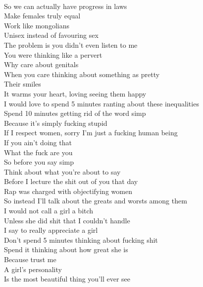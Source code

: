 \documentclass[12pt, b5paper, oneside]{book}
\begin{document}
\\So we can actually have progress in laws
\\Make females truly equal
\\Work like mongolians 
\\Unisex instead of favouring sex
\\The problem is you didn't even listen to me
\\You were thinking like a pervert
\\Why care about genitals 
\\When you care thinking about something as pretty
\\Their smiles
\\It warms your heart, loving seeing them happy
\\I would love to spend 5 minutes ranting about these inequalities 
\\Spend 10 minutes getting rid of the word simp 
\\Because it's simply fucking stupid 
\\If I respect women, sorry I'm just a fucking human being
\\If you ain't doing that
\\What the fuck are you
\\So before you say simp
\\Think about what you're about to say
\\Before I lecture the shit out of you that day
\\Rap was charged with objectifying women 
\\So instead I'll talk about the greats and worsts among them 
\\I would not call a girl a bitch 
\\Unless she did shit that I couldn't handle
\\I say to really appreciate a girl
\\Don't spend 5 minutes thinking about fucking shit 
\\Spend it thinking about how great she is
\\Because trust me 
\\A girl's personality 
\\Is the most beautiful thing you'll ever see

\newpage 
\end{document}
